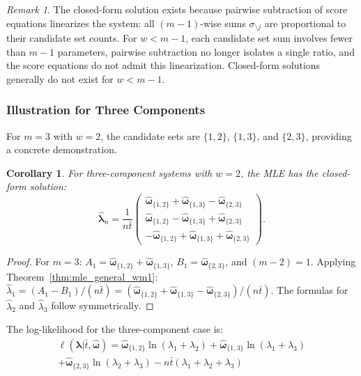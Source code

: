\documentclass[12pt]{article}
\newcommand{\estimator}[1]{\hat{#1}}   %
\newcommand{\expomle}{\boldsymbol{\hat{\lambda}}_n}
\newcommand{\cntsymb}{\boldsymbol{\hat\omega}}
\newcommand{\cnt}[1]{\cntsymb_{\{#1\}}}
\renewcommand{\vec}[1]{\boldsymbol{#1}}
\newtheorem{corollary}[theorem]{Corollary}
\theoremstyle{definition}
\theoremstyle{remark}
\newtheorem{remark}[theorem]{Remark}
\begin{document}
\begin{remark}
The closed-form solution exists because pairwise subtraction of score equations linearizes the system: all $(m-1)$-wise sums $\sigma_{\setminus j}$ are proportional to their candidate set counts. For $w < m-1$, each candidate set sum involves fewer than $m-1$ parameters, pairwise subtraction no longer isolates a single ratio, and the score equations do not admit this linearization. Closed-form solutions generally do not exist for $w < m-1$.
\end{remark}

\subsubsection{Illustration for Three Components}

For $m=3$ with $w=2$, the candidate sets are $\{1,2\}$, $\{1,3\}$, and $\{2,3\}$, providing a concrete demonstration.

\begin{corollary}
\label{cor:mle_3comp_w2}
For three-component systems with $w=2$, the MLE has the closed-form solution:
\begin{equation}
\label{eq:expo_mle_3comp_w2}
\expomle = \frac{1}{n\bar{t}} \begin{pmatrix}
\cnt{1,2} + \cnt{1,3} - \cnt{2,3}\\
\cnt{1,2} - \cnt{1,3} + \cnt{2,3}\\
-\cnt{1,2} + \cnt{1,3} + \cnt{2,3}
\end{pmatrix}.
\end{equation}
\end{corollary}

\begin{proof}
For $m=3$: $A_1 = \cnt{1,2} + \cnt{1,3}$, $B_1 = \cnt{2,3}$, and $(m-2) = 1$. Applying Theorem~\ref{thm:mle_general_wm1}: $\estimator{\lambda}_1 = (A_1 - B_1)/(n\bar{t}) = (\cnt{1,2} + \cnt{1,3} - \cnt{2,3})/(n\bar{t})$. The formulas for $\estimator{\lambda}_2$ and $\estimator{\lambda}_3$ follow symmetrically.
\end{proof}

The log-likelihood for the three-component case is:
\begin{multline}
\ell(\vec{\lambda} | \bar{t}, \cntsymb) = \cnt{1,2} \ln(\lambda_1 + \lambda_2) + \cnt{1,3} \ln(\lambda_1 + \lambda_3) \\
 + \cnt{2,3} \ln(\lambda_2 + \lambda_3) - n\bar{t}(\lambda_1 + \lambda_2 + \lambda_3)
\end{multline}
\end{document}
